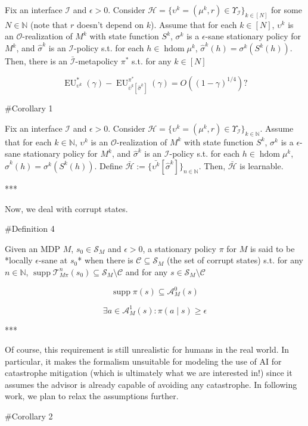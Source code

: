 \documentclass[a4paper]{article}
\DeclareMathOperator{\Supp}{supp}
\newcommand{\Nats}{\mathbb{N}}
\newcommand{\Sq}[2]{\{#1\}_{#2 \in \Nats}}
\newcommand{\Sqn}[1]{\Sq{#1}{n}}
\newcommand{\Ob}{\mathcal{O}}
\newcommand{\A}{\mathcal{A}}
\newcommand{\St}{\mathcal{S}}
\newcommand{\T}{\mathcal{T}}
\newcommand{\In}{\mathcal{I}}
\DeclareMathOperator{\HD}{hdom}
\newcommand{\Hy}{\mathcal{H}}
\newcommand{\Co}{\mathcal{C}}
\newcommand{\EU}{\operatorname{EU}}
\begin{document}
Fix an interface $\In$ and $\epsilon > 0$. Consider $\Hy = \{\upsilon^k = (\mu^k,r) \in \Upsilon_{\In}\}_{k \in [N]}$ for some $N \in \Nats$ (note that $r$ doesn't depend on $k$). Assume that for each $k \in [N]$, $\upsilon^k$ is an $\Ob$-realization of $M^k$ with state function $S^k$, $\sigma^k$ is a $\epsilon$-sane stationary policy for $M^k$, and $\hat{\sigma}^k$ is an $\In$-policy s.t. for each $h \in \HD{\mu^k}$, $\hat{\sigma}^k(h)=\sigma^k\left(S^k(h)\right)$. Then, there is an $\bar{\In}$-metapolicy $\pi^*$ s.t. for any $k \in [N]$

$$\EU_{\upsilon^k}^*(\gamma) - \EU_{\bar{\upsilon}^k\left[\hat{\sigma}^k\right]}^{\pi^*}(\gamma) = O\left((1-\gamma)^{1/4}\right)?$$

\#Corollary 1

Fix an interface $\In$ and $\epsilon > 0$. Consider $\Hy = \{\upsilon^k = (\mu^k,r) \in \Upsilon_{\In}\}_{k \in \Nats}$. Assume that for each $k \in \Nats$, $\upsilon^k$ is an $\Ob$-realization of $M^k$ with state function $S^k$, $\sigma^k$ is a $\epsilon$-sane stationary policy for $M^k$, and $\hat{\sigma}^k$ is an $\In$-policy s.t. for each $h \in \HD{\mu^k}$, $\hat{\sigma}^k(h)=\sigma^k\left(S^k(h)\right)$. Define $\bar{\Hy}:=\Sqn{\bar{\upsilon^k}\left[\hat{\sigma}^k\right]}$. Then, $\bar{\Hy}$ is learnable.

***

Now, we deal with corrupt states.

\#Definition 4

Given an MDP $M$, $s_0 \in \St_M$ and $\epsilon > 0$, a stationary policy $\pi$ for $M$ is said to be *locally $\epsilon$-sane at $s_0$* when there is $\Co \subseteq \St_M$ (the set of corrupt states) s.t. for any $n \in \Nats$, $\Supp{\T_{M\pi}^n\left(s_0\right)} \subseteq \St_M \setminus \Co$ and for any $s \in \St_M \setminus \Co$

$$\Supp{\pi(s)} \subseteq \A_M^0(s)$$

$$\exists a \in \A_M^1(s): \pi(a \mid s) \geq \epsilon$$

***

Of course, this requirement is still unrealistic for humans in the real world. In particular, it makes the formalism unsuitable for modeling the use of AI for catastrophe mitigation (which is ultimately what we are interested in!) since it assumes the advisor is already capable of avoiding any catastrophe. In following work, we plan to relax the assumptions further.

\#Corollary 2
\end{document}
